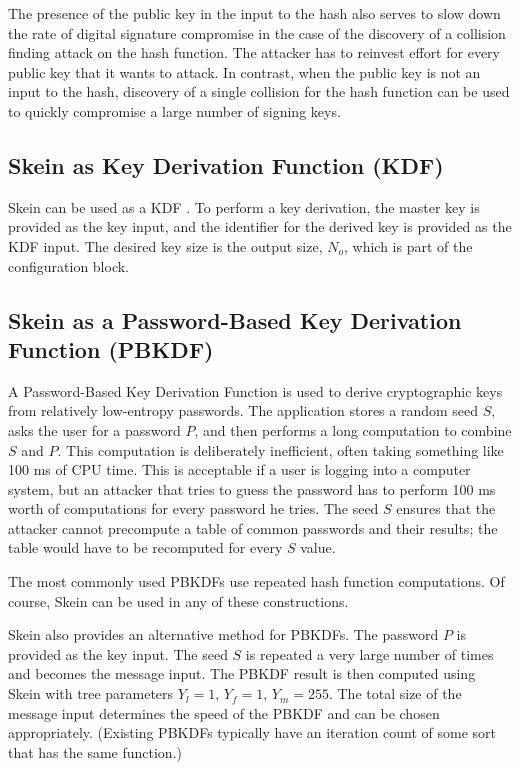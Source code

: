 \documentclass[11pt,twoside]{article}
\begin{document}
The presence of the public key in the input to the hash also serves to slow down the rate of digital signature compromise in the case of the discovery of a collision finding attack on the hash function.  The attacker has to reinvest effort for every public key that it wants to attack.  In contrast, when the public key is not an input to the hash, discovery of a single collision for the hash function can be used to quickly compromise a large number of signing keys.

\subsection{Skein as Key Derivation Function (KDF)}

Skein can be used as a KDF \cite{Kal00,Dodis,ECC,Che08}.  To perform a key derivation, the master key is provided as the key input, and the identifier for the derived key is provided as the KDF input.  The desired key size is the output size, $N_o$, which is part of the configuration block.

\subsection{Skein as a Password-Based Key Derivation Function (PBKDF)}

A Password-Based Key Derivation Function is used to derive cryptographic keys from relatively low-entropy passwords. The application stores a random seed $S$, asks the user for a password $P$, and then performs a long computation to combine $S$ and $P$. This computation is deliberately inefficient, often taking something like 100 ms of CPU time. This is acceptable if a user is logging into a computer system, but an attacker that tries to guess the password has to perform 100 ms worth of computations for every password he tries. The seed $S$ ensures that the attacker cannot precompute a table of common passwords and their results; the table would have to be recomputed for every $S$ value.

The most commonly used PBKDFs \cite{Kal00,ECC} use repeated hash function computations. Of course, Skein can be used in any of these constructions.

Skein also provides an alternative method for PBKDFs. The password $P$ is provided as the key input. The seed $S$ is repeated a very large number of times and becomes the message input. The PBKDF result is then computed using Skein with tree parameters $Y_l=1$, $Y_f=1$, $Y_m=255$. The total size of the message input determines the speed of the PBKDF and can be chosen appropriately. (Existing PBKDFs typically have an iteration count of some sort that has the same function.)
\end{document}
